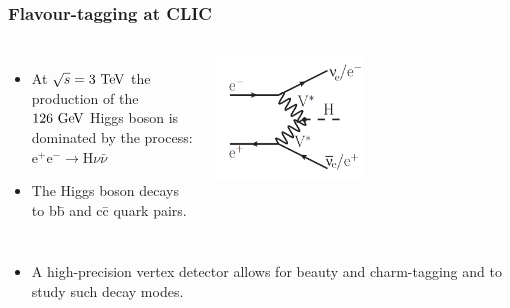 \begin{frame}
\begin{columns}
  \end{columns}





\end{frame}

\begin{frame}
  \frametitle{Flavour-tagging at CLIC}

  \begin{columns}
    \begin{itemize}
    \item At $\sqrt{s}=3\,\mathrm{\,Te\kern -0.1em V}$ the production of the $126\,\mathrm{\,Ge\kern -0.1em V}$
      Higgs
      boson is dominated by the process: \\
      e$^+$e$^- \rightarrow$H$\nu\bar{\nu}$
    \item The Higgs boson decays to b\={b} and c\={c} quark pairs.
    \end{itemize}

    \centering
    \includegraphics[width=0.5\textwidth]{figures/feynman_higgs.png}
  \end{columns}

  \begin{itemize}
  \item A high-precision vertex detector allows for beauty and
    charm-tagging and to study such decay modes.
  \end{itemize}


\end{frame}
